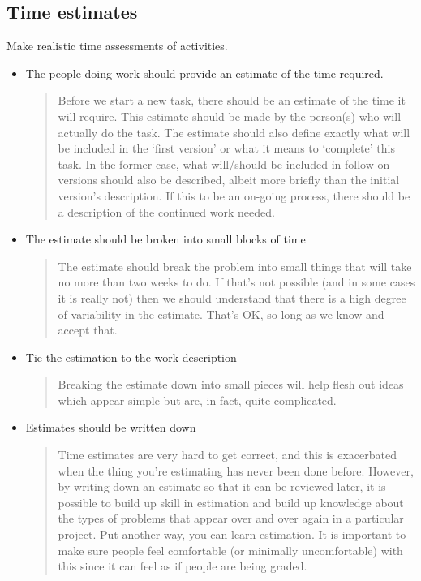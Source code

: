 \documentclass{article}
\begin{document}
\subsection*{Time estimates}
Make realistic time assessments of activities.
\begin{itemize}
\item The people doing work should provide an estimate of the time required.
\begin{quote}
  Before we start a new task, there should be an estimate of the time it will
  require. This estimate should be made by the person(s) who will actually do
  the task. The estimate should also define exactly what will be included in
  the `first version' or what it means to `complete' this task. In the former
  case, what will/should be included in follow on versions should also be
  described, albeit more briefly than the initial version's description. If
  this to be an on-going process, there should be a description of the
  continued work needed.
\end{quote}

\item The estimate should be broken into small blocks of time
\begin{quote}  
  The estimate should break the problem into small things that will take
  no more than two weeks to do. If that's not possible (and in some cases it
  is really not) then we should understand that there is a high degree of
  variability in the estimate. That's OK, so long as we know and accept that.
\end{quote}

\item Tie the estimation to the work description
\begin{quote}  
  Breaking the estimate down into small pieces will help flesh out ideas
  which appear simple but are, in fact, quite complicated.
\end{quote}

\item Estimates should be written down
\begin{quote}  
  Time estimates are very hard to get correct, and this is exacerbated when
  the thing you're estimating has never been done before. However, by writing
  down an estimate so that it can be reviewed later, it is possible to build
  up skill in estimation and build up knowledge about the types of problems
  that appear over and over again in a particular project. Put another way,
  you can learn estimation. It is important to make sure people feel
  comfortable (or minimally uncomfortable) with this since it can feel as if
  people are being graded.
\end{quote}
\end{itemize}
\end{document}
